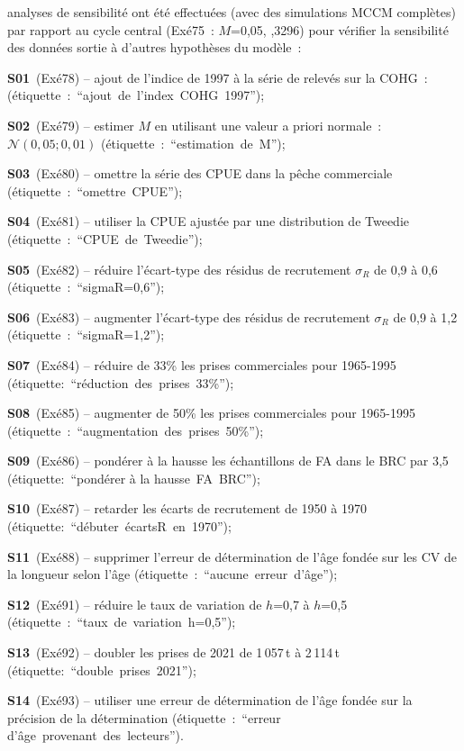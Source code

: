 \documentclass[11pt]{book}
\newcommand{\pc}{\%}
\begin{document}
 analyses de sensibilit\'{e} ont \'{e}t\'{e} effectu\'{e}es (avec des simulations MCCM compl\`{e}tes) par rapport au cycle central (Ex\'{e}75~: $M$=0,05, ,3296) pour v\'{e}rifier la sensibilit\'{e} des donn\'{e}es sortie \`{a} d'autres hypoth\`{e}ses du mod\`{e}le~:
\begin{itemize_csas}{}{}
  \item \textbf{S01}~(Ex\'{e}78)  -- ajout de l'indice de 1997 \`{a} la s\'{e}rie de relev\'{e}s sur la COHG~: (\'{e}tiquette~:~``ajout~de~l'index~COHG~1997'');
  \item \textbf{S02}~(Ex\'{e}79)  -- estimer $M$ en utilisant une valeur a priori normale~: $\mathcal{N}(0,05; 0,01)$ (\'{e}tiquette~:~``estimation~de~M'');
  \item \textbf{S03}~(Ex\'{e}80)  -- omettre la s\'{e}rie des CPUE dans la p\^{e}che commerciale (\'{e}tiquette~:~``omettre~CPUE'');
  \item \textbf{S04}~(Ex\'{e}81)  -- utiliser la CPUE ajust\'{e}e par une distribution de Tweedie (\'{e}tiquette~:~``CPUE~de~Tweedie'');
  \item \textbf{S05}~(Ex\'{e}82)  -- r\'{e}duire l'\'{e}cart-type des r\'{e}sidus de recrutement $\sigma_R$ de 0,9 \`{a} 0,6  (\'{e}tiquette~:~``sigmaR=0,6'');
  \item \textbf{S06}~(Ex\'{e}83)  -- augmenter l'\'{e}cart-type des r\'{e}sidus de recrutement $\sigma_R$ de 0,9 \`{a} 1,2 (\'{e}tiquette~:~``sigmaR=1,2'');
  \item \textbf{S07}~(Ex\'{e}84)  -- r\'{e}duire de 33\pc{} les prises commerciales pour 1965-1995 (\'{e}tiquette:~``r\'{e}duction~des~prises~33\%'');
  \item \textbf{S08}~(Ex\'{e}85)  -- augmenter de 50\pc{} les prises commerciales pour 1965-1995 (\'{e}tiquette~:~``augmentation~des~prises~50\%'');
  \item \textbf{S09}~(Ex\'{e}86)  -- pond\'{e}rer \`{a} la hausse les \'{e}chantillons de FA dans le BRC par 3,5 (\'{e}tiquette:~``pond\'{e}rer \`{a} la hausse~FA~BRC'');
  \item \textbf{S10}~(Ex\'{e}87) -- retarder les \'{e}carts de recrutement de 1950 \`{a} 1970 (\'{e}tiquette:~``d\'{e}buter~\'{e}cartsR~en~1970'');
  \item \textbf{S11}~(Ex\'{e}88) -- supprimer l'erreur de d\'{e}termination de l'\^{a}ge fond\'{e}e sur les CV de la longueur selon l'\^{a}ge (\'{e}tiquette~:~``aucune~erreur~d'\^{a}ge'');
  \item \textbf{S12}~(Ex\'{e}91) -- r\'{e}duire le taux de variation de $h$=0,7 \`{a} $h$=0,5 (\'{e}tiquette~:~``taux~de~variation~h=0,5'');
  \item \textbf{S13}~(Ex\'{e}92) -- doubler les prises de 2021 de 1\,057\,t \`{a} 2\,114\,t (\'{e}tiquette:~``double~prises~2021'');
  \item \textbf{S14}~(Ex\'{e}93) -- utiliser une erreur de d\'{e}termination de l'\^{a}ge fond\'{e}e sur la pr\'{e}cision de la d\'{e}termination (\'{e}tiquette~:~``erreur d'\^{a}ge~provenant~des~lecteurs'').
\end{itemize_csas}
\end{document}
